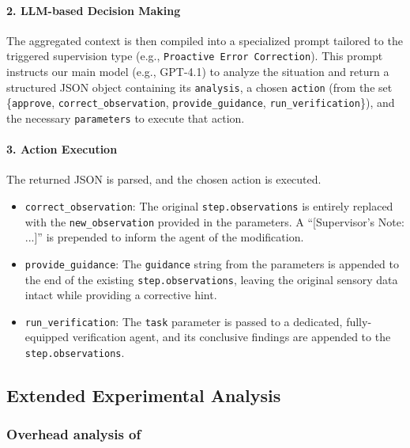 \paragraph{2. LLM-based Decision Making}
The aggregated context is then compiled into a specialized prompt tailored to the triggered supervision type (e.g., \texttt{Proactive Error Correction}). This prompt instructs our main model (e.g., GPT-4.1) to analyze the situation and return a structured JSON object containing its \texttt{analysis}, a chosen \texttt{action} (from the set \{\texttt{approve}, \texttt{correct\_observation}, \texttt{provide\_guidance}, \texttt{run\_verification}\}), and the necessary \texttt{parameters} to execute that action.

\paragraph{3. Action Execution}
The returned JSON is parsed, and the chosen action is executed.
\begin{itemize}[nosep, leftmargin=12pt]
    \item \texttt{correct\_observation}: The original \texttt{step.observations} is entirely replaced with the \texttt{new\_observation} provided in the parameters. A ``[Supervisor's Note: ...]'' is prepended to inform the agent of the modification.
    \item \texttt{provide\_guidance}: The \texttt{guidance} string from the parameters is appended to the end of the existing \texttt{step.observations}, leaving the original sensory data intact while providing a corrective hint.
    \item \texttt{run\_verification}: The \texttt{task} parameter is passed to a dedicated, fully-equipped verification agent, and its conclusive findings are appended to the \texttt{step.observations}.
\end{itemize}






\subsection{Extended Experimental Analysis}

\subsubsection{Overhead analysis of \method}
\label{overhead_analysis}

